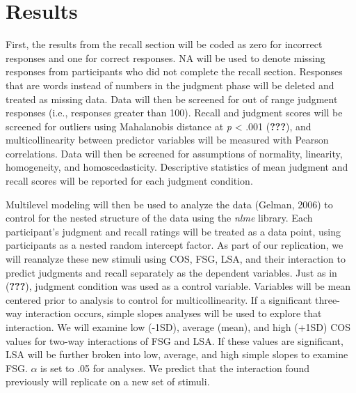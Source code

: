 \documentclass[english,man]{apa6}
\theoremstyle{definition}
\theoremstyle{definition}
\theoremstyle{definition}
\theoremstyle{remark}
\begin{document}
\section{Results}\label{results}

First, the results from the recall section will be coded as zero for
incorrect responses and one for correct responses. NA will be used to
denote missing responses from participants who did not complete the
recall section. Responses that are words instead of numbers in the
judgment phase will be deleted and treated as missing data. Data will
then be screened for out of range judgment responses (i.e., responses
greater than 100). Recall and judgment scores will be screened for
outliers using Mahalanobis distance at \emph{p} \textless{} .001
({\textbf{???}}), and multicollinearity between predictor variables will
be measured with Pearson correlations. Data will then be screened for
assumptions of normality, linearity, homogeneity, and homoscedasticity.
Descriptive statistics of mean judgment and recall scores will be
reported for each judgment condition.

Multilevel modeling will then be used to analyze the data (Gelman, 2006)
to control for the nested structure of the data using the \emph{nlme}
library. Each participant's judgment and recall ratings will be treated
as a data point, using participants as a nested random intercept factor.
As part of our replication, we will reanalyze these new stimuli using
COS, FSG, LSA, and their interaction to predict judgments and recall
separately as the dependent variables. Just as in ({\textbf{???}}),
judgment condition was used as a control variable. Variables will be
mean centered prior to analysis to control for multicollinearity. If a
significant three-way interaction occurs, simple slopes analyses will be
used to explore that interaction. We will examine low (-1SD), average
(mean), and high (+1SD) COS values for two-way interactions of FSG and
LSA. If these values are significant, LSA will be further broken into
low, average, and high simple slopes to examine FSG. \(\alpha\) is set
to .05 for analyses. We predict that the interaction found previously
will replicate on a new set of stimuli.
\end{document}
